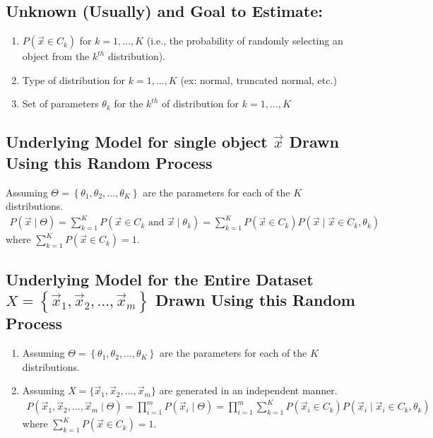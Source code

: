 \documentclass[11pt]{elegantbook}
\begin{document}
\subsection*{Unknown (Usually) and Goal to Estimate:}
\begin{enumerate}[$\bullet$]
    \item $P(\vec{x}\in C_k)$ for $k=1,...,K$ (i.e., the probability of randomly selecting an object from the $k^{th}$ distribution).
    \item Type of distribution for $k=1,...,K$ (ex: normal, truncated normal, etc.)
    \item Set of parameters $\theta_k$ for the $k^{th}$ of distribution for $k=1,...,K$
\end{enumerate}

\subsection*{Underlying Model for single object $\vec{x}$ Drawn Using this Random Process}

Assuming $\Theta=\left\{\theta_1, \theta_2, \ldots, \theta_K\right\}$ are the parameters for each of the $K$ distributions.
$$
\begin{gathered}
P(\vec{x} \mid \Theta)=\sum_{k=1}^K P\left(\vec{x} \in C_k \text { and } \vec{x} \mid \theta_k\right)=\sum_{k=1}^K P\left(\vec{x} \in C_k\right) P\left(\vec{x} \mid \vec{x} \in C_k, \theta_k\right)
\end{gathered}
$$
where  $\sum_{k=1}^K P\left(\vec{x} \in C_k\right)=1$.

\subsection*{Underlying Model for the Entire Dataset $X=\left\{\vec{x}_1, \vec{x}_2, \ldots, \vec{x}_m\right\}$ Drawn Using this
Random Process}
\begin{enumerate}[$\bullet$]
    \item Assuming $\Theta=\left\{\theta_1, \theta_2, \ldots, \theta_K\right\}$ are the parameters for each of the $K$ distributions.
    \item Assuming $X=\{\vec{x}_1,\vec{x}_2,...,\vec{x}_m\}$ are generated in an independent manner.
    $$
    \begin{gathered}
    P\left(\vec{x}_1, \vec{x}_2, \ldots, \vec{x}_m \mid \Theta\right)=\prod_{i=1}^m P\left(\vec{x}_i \mid \Theta\right)=\prod_{i=1}^m \sum_{k=1}^K P\left(\vec{x}_i \in C_k\right) P\left(\vec{x}_i \mid \vec{x}_i \in C_k, \theta_k\right)
    \end{gathered}
    $$
    where $\sum_{k=1}^K P\left(\vec{x} \in C_k\right)=1$.
\end{enumerate}
\end{document}
